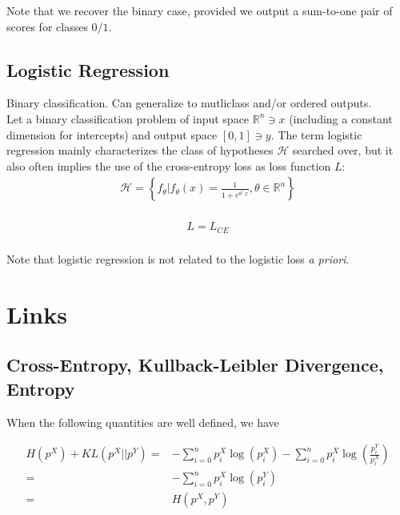 \documentclass{article}
\begin{document}
Note that we recover the binary case, provided we output a sum-to-one pair of scores for classes $0/1$.

\subsection{Logistic Regression}

Binary classification. Can generalize to mutliclass and/or ordered outputs.\\
Let a binary classification problem of input space $\mathbb{R}^n \ni x$ (including a constant dimension for intercepts) and output space $[0,1] \ni y$. The term logistic regression mainly characterizes  the class of hypotheses $\mathcal{H}$ searched over, but it also often implies the use of the cross-entropy loss as loss function $L$:\\

\begin{eqnarray*}
	\mathcal{H} = \left\{ f_\theta | f_\theta(x) = \frac{1}{1+e^{\theta ^\top x}} , \theta \in \mathbb{R}^n \right\}\\
\end{eqnarray*}

\begin{eqnarray*}
	L = L_{CE}\\
\end{eqnarray*}

Note that logistic regression is not related to the logistic loss \emph{a priori}.


\section{Links}


\subsection{Cross-Entropy, Kullback-Leibler Divergence, Entropy}

When the following quantities are well defined, we have

\begin{eqnarray*}
	H(p^X) + KL(p^X||p^Y) =& - \sum_{i=0}^n  p^X_{i} \log(p^X_i) - \sum_{i=0}^n  p^X_{i} \log(\frac{p^Y_i}{p^X_i})\\
										=& - \sum_{i=0}^n  p^X_{i} \log(p^Y_i)\\
										=& H(p^X,p^Y)
\end{eqnarray*}
\end{document}
